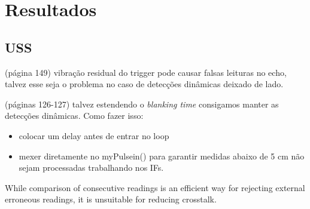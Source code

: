 \chapter{Resultados}

\section{USS}

\cite{jones}(página 149) vibração residual do trigger pode causar falsas leituras no echo, talvez esse seja o problema no caso de detecções dinâmicas 
deixado de lado.

\cite{siegwart} (páginas 126-127) talvez estendendo o \textit{blanking time} consigamos manter as detecções dinâmicas. Como fazer isso:
\begin{itemize}
 \item colocar um delay antes de entrar no loop
 \item mexer diretamente no myPulsein() para garantir medidas abaixo de 5 cm não sejam processadas trabalhando nos IFs. 
\end{itemize}

 While comparison of consecutive readings is an efficient way for rejecting external
 erroneous readings, it is unsuitable for reducing crosstalk. \cite{2016_artigo_1}

